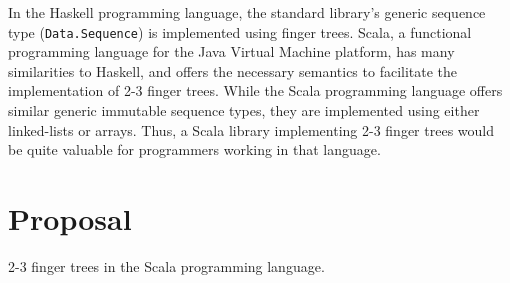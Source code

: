 \documentclass[a4paper,nobib]{tufte-handout}
\begin{document}
In the Haskell programming language, the standard library's generic sequence type (\Verb|Data.Sequence|) is implemented using finger trees.\cite[-1in]{data_sequence} Scala, a functional programming language for the Java Virtual Machine platform, has many similarities to Haskell,\cite{odersky2004overview} and offers the necessary semantics to facilitate the implementation of 2-3 finger trees. While the Scala programming language offers similar generic immutable sequence types, they are implemented using either linked-lists or arrays.\cite{scala_std} Thus, a Scala library implementing 2-3 finger trees would be quite valuable for programmers working in that language.

\section{Proposal}

 2-3 finger trees in the Scala programming language.



\end{document}
